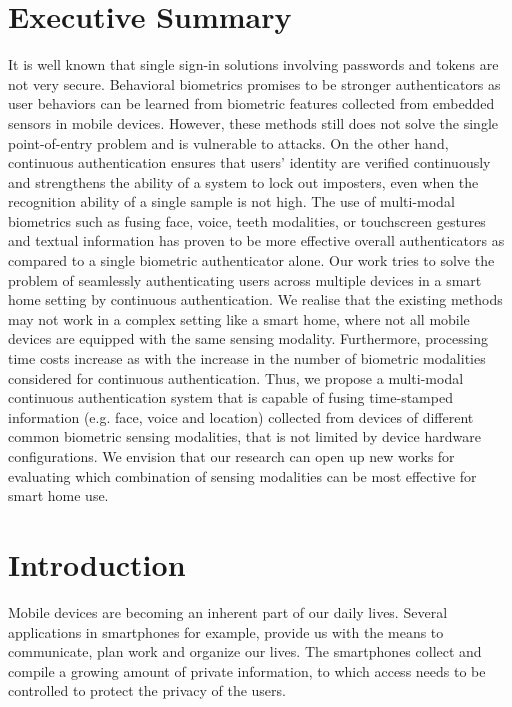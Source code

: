 \documentclass[a4paper, 11pt]{article}
\begin{document}
\section*{Executive Summary}
It is well known that single sign-in solutions involving passwords and tokens are not very secure. Behavioral biometrics promises to be stronger authenticators as user behaviors can be learned from biometric features collected from embedded sensors in mobile devices. However, these methods still does not solve the single point-of-entry problem and is vulnerable to attacks. On the other hand, continuous authentication ensures that users’ identity are verified continuously and strengthens the ability of a system to lock out imposters, even when the recognition ability of a single sample is not high. The use of multi-modal biometrics such as fusing face, voice, teeth modalities, or touchscreen gestures and textual information has proven to be more effective overall authenticators as compared to a single biometric authenticator alone. Our work  tries to solve the problem of seamlessly authenticating users across multiple devices in a smart home setting by continuous authentication. We realise that the existing methods may not work in a complex setting like a smart home, where not all mobile devices are equipped with the same sensing modality. Furthermore, processing time costs increase as with the increase in the number of biometric modalities considered for continuous authentication. Thus, we propose a multi-modal continuous authentication system that is capable of fusing time-stamped information (e.g. face, voice and location) collected from devices of different common biometric sensing modalities, that is not limited by device hardware configurations. We envision that our research can open up new works for evaluating which combination of sensing modalities can be most effective for smart home use. 

\section*{Introduction}
Mobile devices are becoming an inherent part of our daily lives. Several applications in smartphones for example, provide us with the means to communicate, plan work and organize our lives. The smartphones collect and compile a growing amount of private information, to which access needs to be controlled to protect the privacy of the users. 
\end{document}

